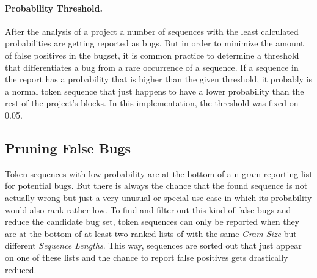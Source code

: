 \paragraph{Probability Threshold.}
After the analysis of a project a number of sequences with the least calculated probabilities are getting reported as bugs. But in order to minimize the amount of false positives in the bugset, it is common practice to determine a threshold that differentiates a bug from a rare occurrence of a sequence. If a sequence in the report has a probability that is higher than the given threshold, it probably is a normal token sequence that just happens to have a lower probability than the rest of the project's blocks. In this implementation, the threshold was fixed on 0.05.

\subsection{Pruning False Bugs}\label{subsec:false_bugs}
Token sequences with low probability are at the bottom of a n-gram reporting list for potential bugs. But there is always the chance that the found sequence is not actually wrong but just a very unusual or special use case in which its probability would also rank rather low. To find and filter out this kind of false bugs and reduce the candidate bug set, token sequences can only be reported when they are at the bottom of at least two ranked lists of  with the same \textit{Gram Size} but different \textit{Sequence Lengths}. This way, sequences are sorted out that just appear on one of these lists and the chance to report false positives gets drastically reduced. 